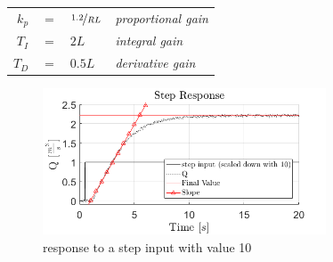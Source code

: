 \begin{tabular}{r c l l}
	$k_p$ & $=$ & $\nicefrac{1.2}{RL}$	& \footnotesize{\textit{proportional gain}}\\
	$T_I$ & $=$ & $2L$					& \footnotesize{\textit{integral gain}}\\
	$T_D$ & $=$ & $0.5L$ 				& \footnotesize{\textit{derivative gain}}\\
\end{tabular}


\begin{figure}[H]
    \centering
    \includegraphics[width=0.75\textwidth]{figures/04ExperimentsAndLabWork/UnitStepResponse1Pump.png}
    \caption{response to a step input with value 10}
	\label{fig:stepin}
\end{figure}
\\ \\ \\ \\
